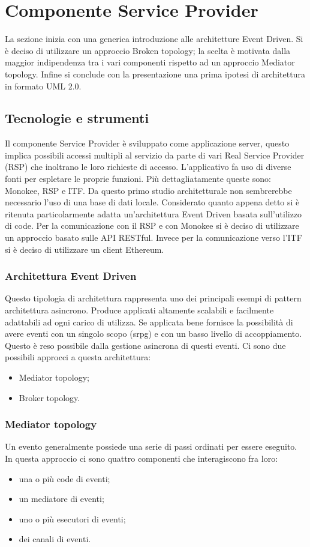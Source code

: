 \section{Componente Service Provider}
La sezione inizia con una generica introduzione alle architetture Event Driven. Si è deciso di utilizzare un approccio Broken topology; la scelta è motivata dalla maggior indipendenza tra i vari componenti rispetto ad un approccio Mediator topology. Infine si conclude con la presentazione una prima ipotesi di architettura in formato UML 2.0.



\subsection{Tecnologie e strumenti}
\label{sec:tecnologie-strumenti}
Il componente Service Provider è sviluppato come applicazione server, questo implica possibili accessi multipli al servizio da parte di vari Real Service Provider (RSP) che inoltrano le loro richieste di accesso. L’applicativo fa uso di diverse fonti per espletare le proprie funzioni. Più dettagliatamente queste sono: Monokee, RSP e ITF. Da questo primo studio architetturale non sembrerebbe necessario l’uso di una base di dati locale.  Considerato quanto appena detto si è ritenuta particolarmente adatta un’architettura Event Driven basata sull’utilizzo di code. Per la comunicazione con il RSP e con Monokee si è deciso di utilizzare un approccio basato sulle API RESTful. Invece per la comunicazione verso l’ITF si è deciso di utilizzare un client Ethereum.

\subsubsection{Architettura Event Driven}
Questo tipologia di architettura rappresenta uno dei principali esempi di pattern architettura asincrono. Produce applicati altamente scalabili e facilmente adattabili ad ogni carico di utilizza. Se applicata bene fornisce la possibilità di avere eventi con un singolo scopo (\gls{srpg}\glsfirstoccur) e con un basso livello di accoppiamento. Questo è reso possibile dalla gestione asincrona di questi eventi.
Ci sono due possibili approcci a questa architettura:
\begin{itemize}
    \item Mediator topology;
    \item Broker topology.
\end{itemize}
\subsubsection{Mediator topology}
Un evento generalmente possiede una serie di passi ordinati per essere eseguito. In questa approccio ci sono quattro componenti che interagiscono fra loro:
\begin{itemize}
    \item una o più code di eventi;
    \item un mediatore di eventi;
    \item uno o più esecutori di eventi;
    \item dei canali di eventi.
\end{itemize}
    
